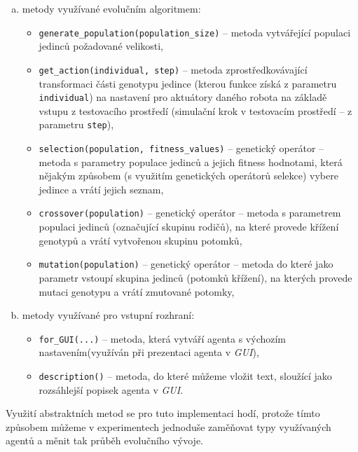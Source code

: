 \begin{enumerate}[a)]
    \item metody využívané evolučním algoritmem:
        \begin{itemize}
            \item \texttt{generate\_population(population\_size)} -- metoda
                vytvářející populaci jedinců požadované velikosti,
            \item \texttt{get\_action(individual, step)} -- metoda
                zprostředkovávající transformaci části genotypu jedince
                (kterou funkce získá z parametru \texttt{individual}) na
                nastavení pro aktuátory daného robota na základě vstupu z
                testovacího prostředí (simulační krok v testovacím prostředí --
                z parametru \texttt{step}),
            \item \texttt{selection(population, fitness\_values)} -- genetický
                operátor -- metoda s parametry populace jedinců a jejich
                fitness hodnotami, která nějakým způsobem (s využitím
                genetických operátorů selekce) vybere jedince a vrátí jejich
                seznam,
            \item \texttt{crossover(population)} -- genetický operátor --
                metoda s parametrem populaci jedinců (označující skupinu
                rodičů), na které provede křížení genotypů a vrátí vytvořenou
                skupinu potomků,
            \item \texttt{mutation(population)} -- genetický operátor -- metoda
                do které jako parametr vstoupí skupina jedinců (potomků
                křížení), na kterých provede mutaci genotypu a vrátí
                zmutované potomky,
        \end{itemize}
    \item metody využívané pro vstupní rozhraní:
        \begin{itemize}
            \item \texttt{for\_GUI(...)} -- metoda, která vytváří agenta s
                výchozím nastavením(využíván při prezentaci agenta v
                \emph{GUI}),
            \item \texttt{description()} -- metoda, do které můžeme vložit
                text, sloužící jako rozsáhlejší popisek agenta v \emph{GUI}.
        \end{itemize}
\end{enumerate}

Využití abstraktních metod se pro tuto implementaci hodí, protože tímto
způsobem můžeme v experimentech jednoduše zaměňovat typy využívaných
agentů a měnit tak průběh evolučního vývoje. 

